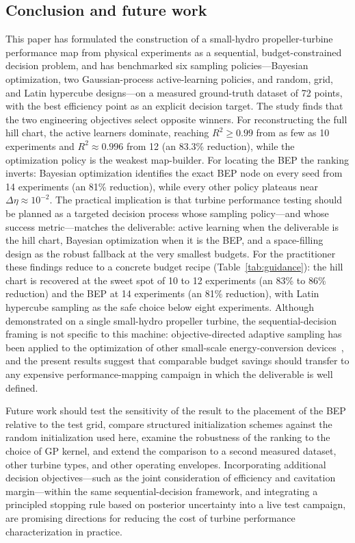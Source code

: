 \documentclass[preprint,12pt]{elsarticle}
\begin{document}
\subsection{Conclusion and future work}\label{sec:conclusion}
This paper has formulated the construction of a small-hydro propeller-turbine
performance map from physical experiments as a sequential, budget-constrained decision
problem, and has benchmarked six sampling policies---Bayesian optimization, two
Gaussian-process active-learning policies, and random, grid, and Latin hypercube
designs---on a measured ground-truth dataset of 72 points, with the best efficiency
point as an explicit decision target. The study finds that the two engineering
objectives select opposite winners. For reconstructing the full hill chart, the active
learners dominate, reaching $R^2 \geq 0.99$ from as few as 10 experiments and
$R^2 \approx 0.996$ from 12 (an 83.3\% reduction), while the optimization policy is the
weakest map-builder. For locating the BEP the ranking inverts: Bayesian optimization
identifies the exact BEP node on every seed from 14 experiments (an 81\% reduction),
while every other policy plateaus near $\Delta\eta \approx 10^{-2}$. The practical
implication is that turbine performance testing should be planned as a targeted
decision process whose sampling policy---and whose success metric---matches the
deliverable: active learning when the deliverable is the hill chart, Bayesian
optimization when it is the BEP, and a space-filling design as the robust fallback at
the very smallest budgets. For the practitioner these findings reduce to a concrete
budget recipe (Table~\ref{tab:guidance}): the hill chart is recovered at the sweet
spot of 10 to 12 experiments (an 83\% to 86\% reduction) and the BEP at 14 experiments
(an 81\% reduction), with Latin hypercube sampling as the safe choice below eight
experiments. Although demonstrated on a single small-hydro propeller turbine, the sequential-decision framing is not specific to this machine:
objective-directed adaptive sampling has been applied to the optimization of other
small-scale energy-conversion devices~\cite{sefidgar2023crossflow}, and the present
results suggest that comparable budget savings should transfer to any expensive
performance-mapping campaign in which the deliverable is well defined.

Future work should test the sensitivity of the result to the placement of the BEP
relative to the test grid, compare structured initialization schemes against the
random initialization used here, examine the robustness of the ranking to the choice
of GP kernel, and extend the comparison to a second measured dataset, other turbine
types, and other operating envelopes. Incorporating additional decision
objectives---such as the joint consideration of efficiency and cavitation
margin---within the same sequential-decision framework, and integrating a principled
stopping rule based on posterior uncertainty into a live test campaign, are promising
directions for reducing the cost of turbine performance characterization in practice.
\end{document}
